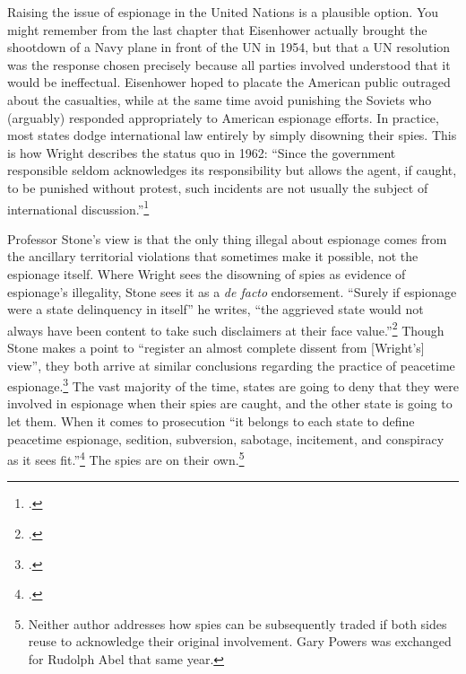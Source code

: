 \documentclass{memoir}
\begin{document}
\begin{refsegment}
Raising the issue of espionage in the United Nations is a plausible option. You might remember from the last chapter that Eisenhower actually brought the shootdown of a Navy plane in front of the UN in 1954, but that a UN resolution was the response chosen precisely because all parties involved understood that it would be ineffectual. Eisenhower hoped to placate the American public outraged about the casualties, while at the same time avoid punishing the Soviets who (arguably) responded appropriately to American espionage efforts. In practice, most states dodge international law entirely by simply disowning their spies. This is how Wright describes the status quo in 1962: ``Since the government responsible \textelp{} seldom acknowledges its responsibility but allows the agent, if caught, to be punished without protest, such incidents are not usually the subject of international discussion.''\footcite[p.~15. As an argument for not invoking international law, I acutally find this a bit silly. Just because a bank robber never flips on their co-conspirators does not mean those co-conspirators cannot be indicted for their role in committing the crime.]{wright_espionage_1962}


Professor Stone's view is that the only thing illegal about espionage comes from the ancillary territorial violations that sometimes make it possible, not the espionage itself. Where Wright sees the disowning of spies as evidence of espionage's illegality, Stone sees it as a \emph{de facto} endorsement. ``Surely if espionage were a state delinquency in itself'' he writes, ``the aggrieved state would not always have been content to take such disclaimers at their face value.''\footcite[p.~33]{stone_legal_1962} Though Stone makes a point to ``register an almost complete dissent from [Wright's] view'', they both arrive at similar conclusions regarding the practice of peacetime espionage.\footcite[p.~33]{stone_legal_1962} The vast majority of the time, states are going to deny that they were involved in espionage when their spies are caught, and the other state is going to let them. When it comes to prosecution ``it belongs to each state to define peacetime espionage, sedition, subversion, sabotage, incitement, and conspiracy as it sees fit.''\footcite[p.~4]{wright_espionage_1962} The spies are on their own.\footnote{Neither author addresses how spies can be subsequently traded if both sides reuse to acknowledge their original involvement. Gary Powers was exchanged for Rudolph Abel that same year.}


\end{refsegment}
\end{document}
